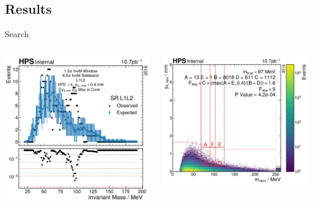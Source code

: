 \documentclass[aspectratio=169]{beamer}
\begin{document}
\subsection{Results}

\begin{frame}{Search}
  \begin{columns}
    \begin{column}{0.45\textwidth}
      \centering
      \includegraphics[width=\textwidth]{../figures/hps/analysis/results/search.pdf}
    \end{column}
    \begin{column}{0.55\textwidth}
      \centering
      \includegraphics[width=\textwidth]{../figures/hps/analysis/results/search-min-p-val.pdf}
    \end{column}
  \end{columns}
\end{frame}
\end{document}
